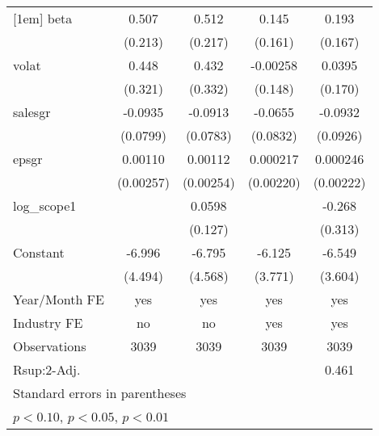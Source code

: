 {\begin{tabular}{l*{4}{c}}
[1em]
beta                &       0.507\sym{**} &       0.512\sym{**} &       0.145         &       0.193         \\
                    &     (0.213)         &     (0.217)         &     (0.161)         &     (0.167)         \\
[1em]
volat               &       0.448         &       0.432         &    -0.00258         &      0.0395         \\
                    &     (0.321)         &     (0.332)         &     (0.148)         &     (0.170)         \\
[1em]
salesgr             &     -0.0935         &     -0.0913         &     -0.0655         &     -0.0932         \\
                    &    (0.0799)         &    (0.0783)         &    (0.0832)         &    (0.0926)         \\
[1em]
epsgr               &     0.00110         &     0.00112         &    0.000217         &    0.000246         \\
                    &   (0.00257)         &   (0.00254)         &   (0.00220)         &   (0.00222)         \\
[1em]
log\_scope1          &                     &      0.0598         &                     &      -0.268         \\
                    &                     &     (0.127)         &                     &     (0.313)         \\
[1em]
Constant            &      -6.996         &      -6.795         &      -6.125         &      -6.549\sym{*}  \\
                    &     (4.494)         &     (4.568)         &     (3.771)         &     (3.604)         \\
\hline
Year/Month FE       &         yes         &         yes         &         yes         &         yes         \\
Industry FE         &          no         &          no         &         yes         &         yes         \\
Observations        &        3039         &        3039         &        3039         &        3039         \\
R{sup:2}-Adj.       &                     &                     &                     &       0.461         \\
\hline\hline
\multicolumn{5}{l}{\footnotesize Standard errors in parentheses}\\
\multicolumn{5}{l}{\footnotesize \sym{*} \(p<0.10\), \sym{**} \(p<0.05\), \sym{***} \(p<0.01\)}\\
\end{tabular}
}
